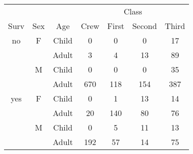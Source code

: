 \documentclass[a4paper]{article}
\begin{document}
\begin{appendix}
\begin{table}[H]
  \centering
  \begin{tabular}{ccc|cccc} \hline
     &     &       & \multicolumn{4}{c}{Class} \\
Surv & Sex & Age   & Crew  & First & Second & Third \\ \hline
no   & F   & Child &    0 &   0 &   0 &  17 \\
     &     & Adult &    3 &   4 &  13 &  89 \\
     & M   & Child &    0 &   0 &   0 &  35 \\
     &     & Adult &  670 & 118 & 154 & 387 \\
yes  & F   & Child &    0 &   1 &  13 &  14 \\ 
     &     & Adult &   20 & 140 &  80 &  76 \\ 
     & M   & Child &    0 &   5 &  11 &  13 \\
     &     & Adult &  192 &  57 &  14 &  75 \\
\hline
  \end{tabular}
  \label{tab:titanic}
\end{table}
\end{appendix}
\end{document}
